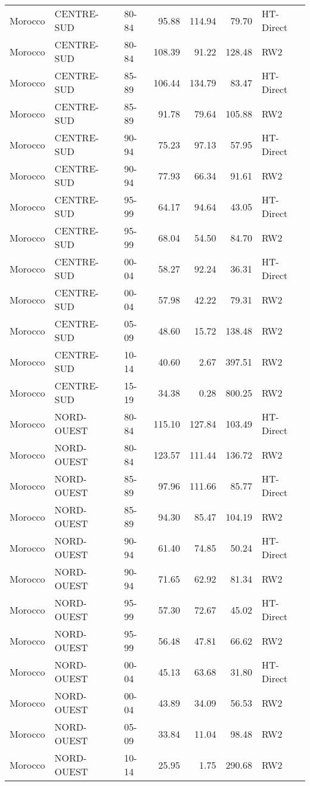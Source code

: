 \begin{longtable}{lllrrrl}
  Morocco & CENTRE-SUD & 80-84 & 95.88 & 114.94 & 79.70 & HT-Direct \\ 
  Morocco & CENTRE-SUD & 80-84 & 108.39 & 91.22 & 128.48 & RW2 \\ 
  Morocco & CENTRE-SUD & 85-89 & 106.44 & 134.79 & 83.47 & HT-Direct \\ 
  Morocco & CENTRE-SUD & 85-89 & 91.78 & 79.64 & 105.88 & RW2 \\ 
  Morocco & CENTRE-SUD & 90-94 & 75.23 & 97.13 & 57.95 & HT-Direct \\ 
  Morocco & CENTRE-SUD & 90-94 & 77.93 & 66.34 & 91.61 & RW2 \\ 
  Morocco & CENTRE-SUD & 95-99 & 64.17 & 94.64 & 43.05 & HT-Direct \\ 
  Morocco & CENTRE-SUD & 95-99 & 68.04 & 54.50 & 84.70 & RW2 \\ 
  Morocco & CENTRE-SUD & 00-04 & 58.27 & 92.24 & 36.31 & HT-Direct \\ 
  Morocco & CENTRE-SUD & 00-04 & 57.98 & 42.22 & 79.31 & RW2 \\ 
  Morocco & CENTRE-SUD & 05-09 & 48.60 & 15.72 & 138.48 & RW2 \\ 
  Morocco & CENTRE-SUD & 10-14 & 40.60 & 2.67 & 397.51 & RW2 \\ 
  Morocco & CENTRE-SUD & 15-19 & 34.38 & 0.28 & 800.25 & RW2 \\ 
  Morocco & NORD-OUEST & 80-84 & 115.10 & 127.84 & 103.49 & HT-Direct \\ 
  Morocco & NORD-OUEST & 80-84 & 123.57 & 111.44 & 136.72 & RW2 \\ 
  Morocco & NORD-OUEST & 85-89 & 97.96 & 111.66 & 85.77 & HT-Direct \\ 
  Morocco & NORD-OUEST & 85-89 & 94.30 & 85.47 & 104.19 & RW2 \\ 
  Morocco & NORD-OUEST & 90-94 & 61.40 & 74.85 & 50.24 & HT-Direct \\ 
  Morocco & NORD-OUEST & 90-94 & 71.65 & 62.92 & 81.34 & RW2 \\ 
  Morocco & NORD-OUEST & 95-99 & 57.30 & 72.67 & 45.02 & HT-Direct \\ 
  Morocco & NORD-OUEST & 95-99 & 56.48 & 47.81 & 66.62 & RW2 \\ 
  Morocco & NORD-OUEST & 00-04 & 45.13 & 63.68 & 31.80 & HT-Direct \\ 
  Morocco & NORD-OUEST & 00-04 & 43.89 & 34.09 & 56.53 & RW2 \\ 
  Morocco & NORD-OUEST & 05-09 & 33.84 & 11.04 & 98.48 & RW2 \\ 
  Morocco & NORD-OUEST & 10-14 & 25.95 & 1.75 & 290.68 & RW2 \\ 

\end{longtable}

